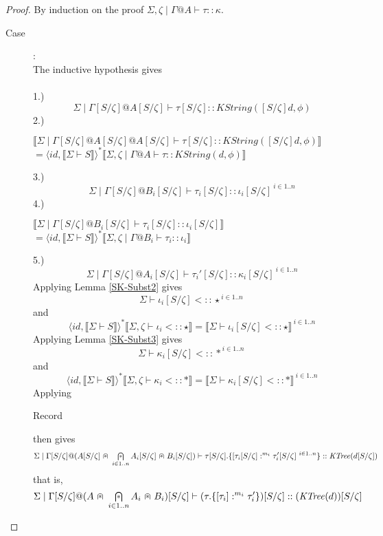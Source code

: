 \documentclass{article}
\newcommand{\sem}[1]{\llbracket #1 \rrbracket}
\newcommand{\capdot}{~\stackinset{c}{}{c}{}{\scalebox{0.8}{$\ast$}}{$\cap$}~}
\newcommand{\bigcapdot}{\mathop{\stackinset{c}{}{c}{}{\scalebox{0.8}{$\ast$}}{$\bigcap$}}}
\begin{document}
\begin{proof}
By induction on the proof $\Sigma,\zeta \mid \Gamma @ A \vdash \tau :: \kappa$.

\begin{description}
\item[Case ]:~\\
The inductive hypothesis gives~\\~\\ 1.) $$\Sigma \mid \Gamma[S/\zeta] @ A[S/\zeta] \vdash \tau[S/\zeta] :: \mathit{KString}([S/\zeta]d,\phi)$$ 2.)
\begin{center}
$\sem{\Sigma \mid \Gamma[S/\zeta]@A[S/\zeta] @ A[S/\zeta] \vdash \tau[S/\zeta] :: KString([S/\zeta]d,\phi)}$\\$= \langle \mathit{id}, \sem{\Sigma \vdash S} \rangle^* \sem{\Sigma,\zeta \mid \Gamma @ A \vdash \tau :: \mathit{KString}(d,\phi)}$
\end{center}
3.)\\
$$\Sigma \mid \Gamma[S/\zeta] @ B_i[S/\zeta] \vdash \tau_i[S/\zeta] :: \iota_i[S/\zeta]^{~i \in 1..n}$$
4.)
\begin{center}
$\sem{\Sigma \mid \Gamma[S/\zeta] @ B_i[S/\zeta] \vdash \tau_i[S/\zeta] :: \iota_i[S/\zeta]}$\\
$= \langle \mathit{id}, \sem{\Sigma \vdash S} \rangle^* \sem{\Sigma,\zeta \mid \Gamma @ B_i \vdash \tau_i :: \iota_i}$
\end{center}
5.)
$$\Sigma \mid \Gamma[S/\zeta ]@ A_i[S/\zeta] \vdash \tau_i'[S/\zeta] :: \kappa_i[S/\zeta]^{~i \in 1..n}$$
Applying Lemma \ref{SK-Subst2} gives
$$\Sigma \vdash \iota_i[S/\zeta] <:: \star^{~i \in 1..n}$$
and 
$$\langle \mathit{id}, \sem{\Sigma \vdash S} \rangle^* \sem{\Sigma,\zeta \vdash \iota_i <:: \star} = \sem{\Sigma \vdash \iota_i[S/\zeta] <:: \star}^{~i \in 1..n}$$
Applying Lemma \ref{SK-Subst3} gives
$$\Sigma \vdash \kappa_i[S/\zeta] <:: \ast^{~i \in 1..n}$$ 
and
$$\langle \mathit{id}, \sem{\Sigma \vdash S} \rangle^* \sem{\Sigma,\zeta \vdash \kappa_i <:: \ast} = \sem{\Sigma \vdash \kappa_i[S/\zeta] <:: \ast}^{~i \in 1..n}$$
Applying \begin{sc}Record\end{sc} then gives 
$$\Sigma \mid \Gamma[S/\zeta] @ (A[S/\zeta] \capdot \bigcapdot_{i \in 1.. n} A_i[S/\zeta] \capdot B_i[S/\zeta]) \vdash \tau[S/\zeta].\{ [\tau_i[S/\zeta] :^{m_i} \tau_i'[S/\zeta]^{~i \in 1..n} \} :: \mathit{KTree}(d[S/\zeta])$$
that is,
$$\Sigma \mid \Gamma[S/\zeta] @ (A \capdot \bigcapdot_{i \in 1..n} A_i \capdot B_i)[S/\zeta] \vdash (\tau.\{ [\tau_i] :^{m_i} \tau'_i \})[S/\zeta] :: (\mathit{KTree}(d))[S/\zeta]$$

\end{description}
\end{proof}
\end{document}

